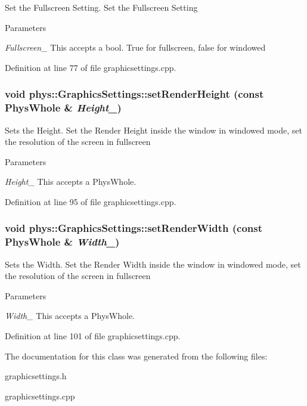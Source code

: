 Set the Fullscreen Setting. Set the Fullscreen Setting 
\begin{DoxyParams}{Parameters}
\item[{\em Fullscreen\_\-}]This accepts a bool. True for fullscreen, false for windowed \end{DoxyParams}


Definition at line 77 of file graphicsettings.cpp.\hypertarget{classphys_1_1GraphicsSettings_ace1f9f0f9c29a0c82524ce0bcffd16fa}{
\subsubsection[{setRenderHeight}]{\setlength{\rightskip}{0pt plus 5cm}void phys::GraphicsSettings::setRenderHeight (const PhysWhole \& {\em Height\_\-})}}
\label{dc/df1/classphys_1_1GraphicsSettings_ace1f9f0f9c29a0c82524ce0bcffd16fa}


Sets the Height. Set the Render Height inside the window in windowed mode, set the resolution of the screen in fullscreen 
\begin{DoxyParams}{Parameters}
\item[{\em Height\_\-}]This accepts a PhysWhole. \end{DoxyParams}


Definition at line 95 of file graphicsettings.cpp.\hypertarget{classphys_1_1GraphicsSettings_a4d74a7f2f880a5d556f43bcdbedc5e27}{
\subsubsection[{setRenderWidth}]{\setlength{\rightskip}{0pt plus 5cm}void phys::GraphicsSettings::setRenderWidth (const PhysWhole \& {\em Width\_\-})}}
\label{dc/df1/classphys_1_1GraphicsSettings_a4d74a7f2f880a5d556f43bcdbedc5e27}


Sets the Width. Set the Render Width inside the window in windowed mode, set the resolution of the screen in fullscreen 
\begin{DoxyParams}{Parameters}
\item[{\em Width\_\-}]This accepts a PhysWhole. \end{DoxyParams}


Definition at line 101 of file graphicsettings.cpp.

The documentation for this class was generated from the following files:\begin{DoxyCompactItemize}
\item 
graphicsettings.h\item 
graphicsettings.cpp\end{DoxyCompactItemize}
